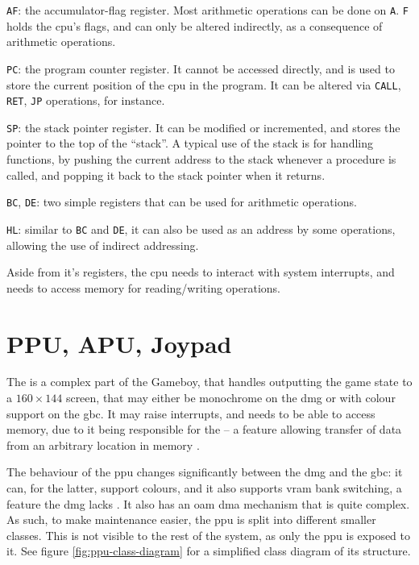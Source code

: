 \documentclass[11pt]{informatics-report}
\begin{document}
\begin{compactitem}
	\item \texttt{AF}: the accumulator-flag register. Most arithmetic operations can be done on \texttt{A}. \texttt{F} holds the \gls{cpu}'s flags, and can only be altered indirectly, as a consequence of arithmetic operations.
	\item \texttt{PC}: the program counter register. It cannot be accessed directly, and is used to store the current position of the \gls{cpu} in the program. It can be altered via \texttt{CALL}, \texttt{RET}, \texttt{JP} operations, for instance.
	\item \texttt{SP}: the stack pointer register. It can be modified or incremented, and stores the pointer to the top of the ``stack''. A typical use of the stack is for handling functions, by pushing the current address to the stack whenever a procedure is called, and popping it back to the stack pointer when it returns.
	\item \texttt{BC}, \texttt{DE}: two simple registers that can be used for arithmetic operations.
	\item \texttt{HL}: similar to \texttt{BC} and \texttt{DE}, it can also be used as an address by some operations, allowing the use of indirect addressing.
\end{compactitem}

Aside from it's registers, the \gls{cpu} needs to interact with system interrupts, and needs to access memory for reading/writing operations.

\section{PPU, APU, Joypad}

The  is a complex part of the Gameboy, that handles outputting the game state to a $160 \times 144$ screen, that may either be monochrome on the \gls{dmg} or with colour support on the \gls{gbc}. It may raise interrupts, and needs to be able to access memory, due to it being responsible for the   -- a feature allowing transfer of data from an arbitrary location in memory \cite[OAM DMA Transfer]{pandoc}.

The behaviour of the \gls{ppu} changes significantly between the \gls{dmg} and the \gls{gbc}: it can, for the latter, support colours, and it also supports \gls{vram} bank switching, a feature the \gls{dmg} lacks \cite[CGB Registers]{pandoc}. It also has an \gls{oam} \gls{dma} mechanism that is quite complex. As such, to make maintenance easier, the \gls{ppu} is split into different smaller classes. This is not visible to the rest of the system, as only the \gls{ppu} is exposed to it. See figure \ref{fig:ppu-class-diagram} for a simplified class diagram of its structure.
\end{document}
